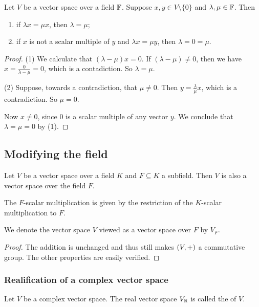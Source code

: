 \begin{lemma} \label{scalarMultiplicationBijection}
Let $V$ be a vector space over a field $\mathbb{F}$. Suppose $x,y\in V\setminus\{0\}$ and $\lambda,\mu\in \mathbb{F}$. Then
\begin{enumerate}
\item if $\lambda x = \mu x$, then $\lambda = \mu$;
\item if $x$ is not a scalar multiple of $y$ and $\lambda x = \mu y$, then $\lambda = 0 = \mu$.
\end{enumerate}
\end{lemma}
\begin{proof}
(1) We calculate that $(\lambda - \mu)x = 0$. If $(\lambda - \mu) \neq 0$, then we have $x = \frac{0}{\lambda - \mu} = 0$, which is a contadiction. So $\lambda = \mu$.

(2) Suppose, towards a contradiction, that $\mu \neq 0$. Then $y = \frac{\lambda}{\mu}x$, which is a contradiction. So $\mu = 0$.

Now $x \neq 0$, since $0$ is a scalar multiple of any vector $y$. We conclude that $\lambda = \mu = 0$ by (1).
\end{proof}

\subsection{Modifying the field}
\begin{proposition} \label{subfieldVectorSpace}
Let $V$ be a vector space over a field $K$ and $F\subseteq K$ a subfield. Then $V$ is also a vector space over the field $F$. 
\end{proposition}
The $F$-scalar multiplication is given by the restriction of the $K$-scalar multiplication to $F$.

We denote the vector space $V$ viewed as a vector space over $F$ by $V_F$.
\begin{proof}
The addition is unchanged and thus still makes $\sSet{V,+}$ a commutative group. The other properties are easily verified.
\end{proof}

\subsubsection{Realification of a complex vector space}
\begin{definition}
Let $V$ be a complex vector space. The real vector space $V_{\mathbb{R}}$ is called the  of $V$.
\end{definition}

